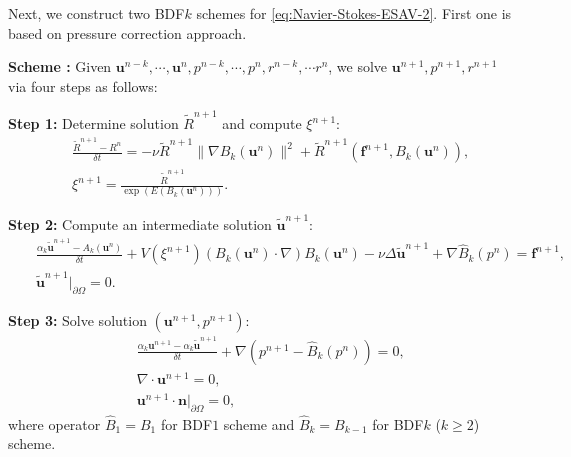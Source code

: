 \documentclass[final,review,onefignum,onetabnum]{siamart190516}
\theoremstyle{plain}
\begin{document}
Next, we construct two BDF$k$ schemes for \eqref{eq:Navier-Stokes-ESAV-2}. 
First one is based on pressure correction approach. 

\textbf{Scheme \uppercase\expandafter{}: }
Given $\mathbf{u}^{n-k}, \cdots, \mathbf{u}^{n},  p^{n-k}, \cdots, p^{n}, r^{n-k}, \cdots r^{n}$, we solve $\mathbf{u}^{n+1}, p^{n+1}, r^{n+1}$ via four steps as follows:

\textbf{Step 1:} Determine solution $\tilde R^{n+1}$ and compute $\xi^{n+1}$:
\begin{eqnarray}
\label{eq:NS-R-ESAV2-BDFk-1}
 && \frac{\tilde{R}^{n+1}-R^{n}}{\delta t} =-\nu \tilde{R}^{n+1} \|\nabla B_{k}\left(\mathbf{u}^{n}\right)\|^{2} + \tilde{R}^{n+1}(\mathbf{f}^{n+1}, B_{k}\left(\mathbf{u}^{n}\right)), \\
 \label{eq:NS-R-ESAV2-BDFk-2}
 && \xi^{n+1}=\frac{\tilde{R}^{n+1}}{\exp\left(E\left(B_{k}\left(\mathbf{u}^{n}\right)\right)\right)}. 	
\end{eqnarray}

\textbf{Step 2:} Compute an intermediate solution $\tilde{\mathbf{u}}^{n+1}$:
\begin{eqnarray}
\label{eq:NS-R-ESAV2-BDFk-3}
& & \frac{\alpha_{k}\tilde{\mathbf{u}}^{n+1}-A_{k}\left(\mathbf{u}^{n}\right)}{\delta t}+V(\xi^{n+1})(B_{k}\left(\mathbf{u}^{n}\right) \cdot \nabla) B_{k}\left(\mathbf{u}^{n}\right)-\nu \Delta \tilde{\mathbf{u}}^{n+1}+\nabla \hat B_{k}\left(p^{n}\right) =\mathbf{f}^{n+1}, \\
\label{eq:NS-R-ESAV2-BDFk-4}
& & \tilde{\mathbf{u}}^{n+1}|_{\partial \Omega} = 0. 
\end{eqnarray}

\textbf{Step 3:} Solve solution $\left(\mathbf{u}^{n+1}, p^{n+1}\right)$:
\begin{eqnarray}
\label{eq:NS-R-ESAV2-BDFk-5}
& & \frac{\alpha_{k} \mathbf{u}^{n+1}- \alpha_{k} \tilde{\mathbf{u}}^{n+1}}{\delta t}+\nabla \left(p^{n+1} - \hat B_{k}\left(p^{n}\right) \right) =0, \\
\label{eq:NS-R-ESAV2-BDFk-6}
& & \nabla \cdot \mathbf{u}^{n+1} =0, \\ 
\label{eq:NS-R-ESAV2-BDFk-7}
& & \mathbf{u}^{n+1}\cdot \mathbf{n}|_{\partial \Omega} = 0, 
\end{eqnarray}
where operator $\hat B_{1}=B_{1}$ for BDF$1$ scheme and $\hat B_{k}=B_{k-1}$ for BDF$k$ ($k \geq 2$) scheme.
\end{document}

